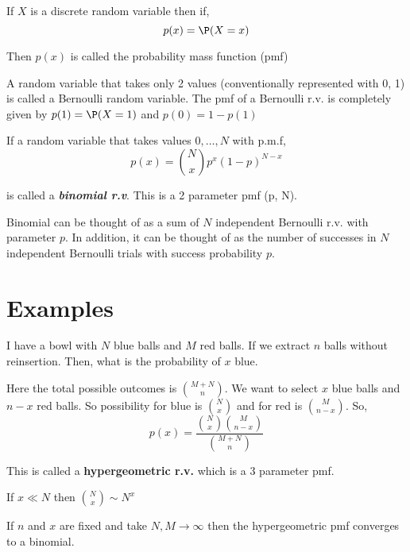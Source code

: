 \begin{definition}
    If $X$ is a discrete random variable then if,
    $$ p(x)= \P(X = x) $$ 

    Then $p(x)$ is called the probability mass function (pmf)
\end{definition}
\begin{remark}
    A random variable that takes only 2 values (conventionally represented with 0, 1) is called a Bernoulli random variable. The pmf of a Bernoulli  r.v. is completely given by $p(1) = \P(X = 1)$ and $p(0) = 1 - p(1)$
\end{remark}
\begin{remark}
    If a random variable that takes values $0, \dots, N$ with  p.m.f, 
    $$ p(x) = {N \choose x} p^{x}(1 - p)^{N - x} $$ 

    is called a \emph{\textbf{binomial r.v}}. This is a 2 parameter pmf (p, N).
    \vspace{1em}

    Binomial can be thought of as a sum of $N$ independent Bernoulli r.v. with parameter $p$. In addition, it can be thought of as the number of successes in $N$ independent Bernoulli trials with success probability $p$.
    
\end{remark}

\section{Examples}

\begin{eg}
    I have a bowl with $N$ blue balls and $M$ red balls. If we extract $n$ balls without reinsertion. Then, what is the probability of $x$ blue.

    Here the total possible outcomes is ${M + N \choose n}$. We want to select  $x$ blue balls and $n - x$ red balls. So possibility for blue  is   ${N \choose x}$ and for red is  ${M \choose n - x}$. So, 
    $$ p(x) = \frac{{N \choose x}{M \choose n - x}}{{M + N \choose n}} $$ 


    This is called a \textbf{hypergeometric r.v.}  which is a 3 parameter pmf.
\end{eg}
\begin{note}
    If $x \ll N$ then  ${N \choose x} \sim N^{x}$
\end{note}
\begin{remark}
    If $n$ and  $x$ are fixed and take $N, M \to \infty$ then the hypergeometric pmf converges to a binomial.
\end{remark}



